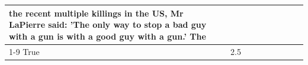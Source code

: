 \begin{table}[H]
\begin{tabular}{lllrlllll}
the recent multiple killings in the US, Mr LaPierre said: 'The only way to stop a bad guy with a gun is with a good guy with a gun.' The \\
\cline{1-9}
True & 2.5%

\end{tabular}
\end{table}
